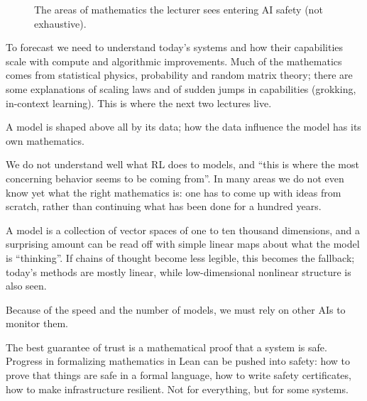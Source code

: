 \begin{figure}[tb]
\caption{The areas of mathematics the lecturer sees entering AI safety (not exhaustive).}
\label{fig:L1-map}
\end{figure}

\begin{description}[style=nextline, leftmargin=0pt]
  \item[Trajectories.] To forecast we need to understand today's systems and how their capabilities scale with compute and algorithmic improvements. Much of the mathematics comes from statistical physics, probability and random matrix theory; there are some explanations of scaling laws and of sudden jumps in capabilities (grokking, in-context learning). This is where the next two lectures live.
  \item[Training data.] A model is shaped above all by its data; how the data influence the model has its own mathematics.
  \item[Reinforcement learning.] We do not understand well what RL does to models, and ``this is where the most concerning behavior seems to be coming from''. In many areas we do not even know yet what the right mathematics is: one has to come up with ideas from scratch, rather than continuing what has been done for a hundred years.
  \item[Geometry inside LLMs.] A model is a collection of vector spaces of one to ten thousand dimensions, and a surprising amount can be read off with simple linear maps about what the model is ``thinking''. If chains of thought become less legible, this becomes the fallback; today's methods are mostly linear, while low-dimensional nonlinear structure is also seen.
  \item[Scalable oversight.] Because of the speed and the number of models, we must rely on other AIs to monitor them.
  \item[Guarantees.] The best guarantee of trust is a mathematical proof that a system is safe. Progress in formalizing mathematics in Lean can be pushed into safety: how to prove that things are safe in a formal language, how to write safety certificates, how to make infrastructure resilient. Not for everything, but for some systems.

\end{description}
